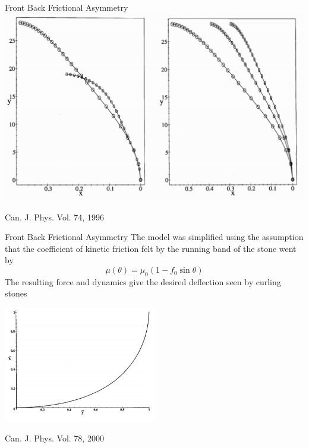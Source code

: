 \documentclass{beamer}
\begin{document}
\begin{frame}{Front Back Frictional Asymmetry}
            \centering
            \includegraphics[width=1.0\textwidth]{Images/Shegelski_Curl_Lin_Vel.png}

            \scriptsize{Can. J. Phys. Vol. 74, 1996}
\end{frame}

\begin{frame}{Front Back Frictional Asymmetry}
    The model was simplified using the assumption that the coefficient of kinetic friction felt by the running band of the stone went by
    $$\mu(\theta) = \mu_0(1-f_0\sin\theta)$$
    The resulting force and dynamics give the desired deflection seen by curling stones

    \centering
    \includegraphics[width=0.5\textwidth]{Images/Shegelski_Curl_Fig.png}

    \scriptsize{Can. J. Phys. Vol. 78, 2000}
\end{frame}
\end{document}
